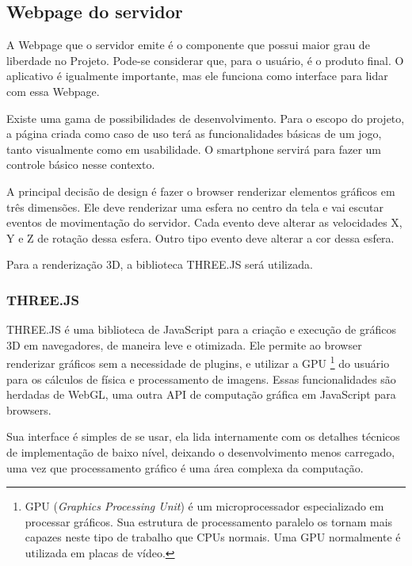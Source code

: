 \documentclass[a4paper,12pt]{article}
\begin{document}
\newpage
\subsection{Webpage do servidor}

A Webpage que o servidor emite é o componente que possui maior grau de liberdade no Projeto. Pode-se considerar que, para o usuário, é o produto final. O aplicativo é igualmente importante, mas ele funciona como interface para lidar com essa Webpage.

Existe uma gama de possibilidades de desenvolvimento. Para o escopo do projeto, a página criada como caso de uso terá as funcionalidades básicas de um jogo, tanto visualmente como em usabilidade. O smartphone servirá para fazer um controle básico nesse contexto.

A principal decisão de design é fazer o browser renderizar elementos gráficos em três dimensões. Ele deve renderizar uma esfera no centro da tela e vai escutar eventos de movimentação do servidor. Cada evento deve alterar as velocidades X, Y e Z de rotação dessa esfera. Outro tipo evento deve alterar a cor dessa esfera.%


Para a renderização 3D, a biblioteca THREE.JS será utilizada.


\subsubsection{THREE.JS}

THREE.JS é uma biblioteca de JavaScript para a criação e execução de gráficos 3D em navegadores, de maneira leve e otimizada. Ele permite ao browser renderizar gráficos sem a necessidade de plugins, e utilizar a GPU \footnote{GPU (\emph{Graphics Processing Unit}) é um microprocessador especializado em processar gráficos. Sua estrutura de processamento paralelo os tornam mais capazes neste tipo de trabalho que CPUs normais. Uma GPU normalmente é utilizada em placas de vídeo.} do usuário para os cálculos de física e processamento de imagens. Essas funcionalidades são herdadas de WebGL, uma outra API de computação gráfica em JavaScript para browsers.

Sua interface é simples de se usar, ela lida internamente com os detalhes técnicos de implementação de baixo nível, deixando o desenvolvimento menos carregado, uma vez que processamento gráfico é uma área complexa da computação.
\end{document}
